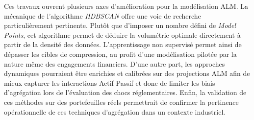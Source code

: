 Ces travaux ouvrent plusieurs axes d'amélioration pour la modélisation ALM. La mécanique de l'algorithme \textit{HDBSCAN} offre une voie de recherche particulièrement pertinente. Plutôt que d'imposer un nombre défini de \textit{Model Points}, cet algorithme permet de déduire la volumétrie optimale directement à partir de la densité des données. L'apprentissage non supervisé permet ainsi de dépasser les cibles de compression, au profit d'une modélisation pilotée par la nature même des engagements financiers. D'une autre part, les approches dynamiques pourraient être enrichies et calibrées sur des projections ALM afin de mieux capturer les interactions Actif-Passif et donc de limiter les biais d'agrégation lors de l'évaluation des chocs réglementaires. Enfin, la validation de ces méthodes sur des portefeuilles réels permettrait de confirmer la pertinence opérationnelle de ces techniques d'agrégation dans un contexte industriel.